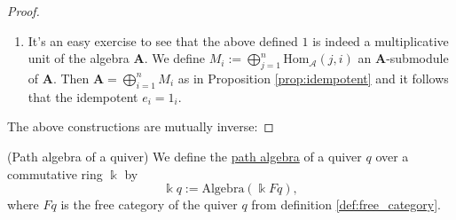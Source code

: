 \begin{proof}
\begin{enumerate}
\renewcommand{\labelenumi}{(\theenumi)}


\[
\mathbf{A} = 1\mathbf{A}1 = \left(\sum_{i}e_{i}\right) \mathbf{A} \left(\sum_{j} e_{j}\right) = \bigoplus_{i,j} e_{i}\mathbf{A}e_{j}
\]
a direct sum decomposition of $\mathbf{A}$ in $\Bbbk$-submodules. The last sum is a direct sum:
\begin{align}
e_{i}\mathbf{A}e_{j} &\cap e_{i'}\mathbf{A}e_{j'} = \delta_{i,i'} \cdot \delta_{j,j'},\,\text{ since }\\
x &= e_{i} \cdot a \cdot e_{j} = e_{i'} \cdot b \cdot e_{j'} \\
x &= \underbrace{e_{i}e_{i}}_{e_{i}} \cdot a \cdot e_{j} = \underbrace{e_{i}e_{i'}}_{= 0} \cdot b \cdot e_{j'},\, &e_{i} \neq e_{i'} \\
x &= e_{i} \cdot a \cdot \underbrace{e_{j}e_{j}}_{e_{j}} = e_{i'} \cdot b \cdot \underbrace{e_{j'}e_{j}}_{= 0},\, &e_{j} \neq e_{j'}
\end{align}

Composition of morphisms
$i \xrightarrow{\alpha} j \xrightarrow{\beta} k$ is defined by the multiplication in $\mathbf{A}$.
Let $\alpha = e_{i}ae_{j}, \beta = e_{j}be_{k}$ with $a, b\in \mathbf{A}$. Then
\begin{align}
\alpha \beta &= (e_{i}ae_{j})(e_{j}be_{k}) \\
&= e_{i}(ae_{j}b)e_{k} \\
&= e_{i}ce_{k}\,\text{ with }\, c := ae_{j}b \in \mathbf{A}.
\end{align}
Associativity of composition follows from associativity of multiplication in $\mathbf{A}$.

\item 

It's an easy exercise to see that the above defined $1$ is indeed a multiplicative unit of the algebra $\mathbf{A}$.
We define $M_{i} := \bigoplus_{j=1}^{n} \mathrm{Hom}_{\mathcal{A}}(j,i)$ an $\mathbf{A}$-submodule of $\mathbf{A}$.
Then $\mathbf{A} = \bigoplus_{i=1}^{n} M_{i}$ as in Proposition \ref{prop:idempotent} and it follows that the idempotent $e_{i} = 1_{i}$.
\end{enumerate}
The above constructions are mutually inverse:
\end{proof}

\begin{definition}{(Path algebra of a quiver)}\label{def:path_algebra}
We define the \ul{path algebra} of a quiver $q$ over a commutative ring $\Bbbk$ by
\[
\Bbbk q := \mathrm{Algebra}( \Bbbk Fq ),
\]
where $Fq$ is the free category of the quiver $q$ from definition \ref{def:free_category}.
\end{definition}

